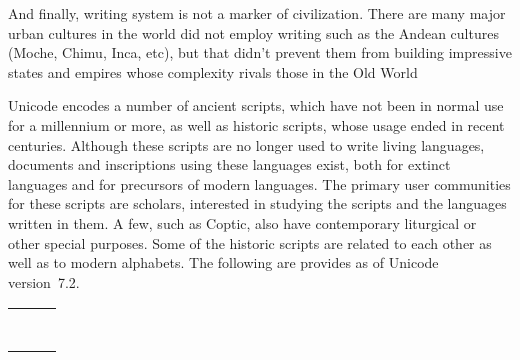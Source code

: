 And finally, writing system is not a marker of civilization. There are many major urban cultures in the world did not employ writing such as the Andean cultures (Moche, Chimu, Inca, etc), but that didn't prevent them from building impressive states and empires whose complexity rivals those in the Old World

Unicode encodes a number of ancient scripts, which have not been in normal use for a millennium or more, as well as historic scripts, whose usage ended in recent centuries. Although these scripts are no longer used to write living languages, documents and inscriptions using these languages exist, both for extinct languages and for precursors of modern languages. The primary user communities for these scripts are scholars, interested in studying the scripts and the languages written in them. A few, such as Coptic, also have contemporary liturgical or other special purposes. Some of the historic scripts are related to each other as well as to modern alphabets. The following are provides as of Unicode version~7.2.
\begin{center}
\begin{tabular}{lll}
\nameref{s:ogham}           
&\nameref{s:anatolian}
&\nameref{s:avestan}\\

\nameref{s:olditalic}      
&\nameref{s:oldsoutharabian}          
&\nameref{s:ugaritic} \\

    \nameref{s:runic}
&\nameref{s:phoenician} 
&\nameref{s:oldpersian} \\
    \nameref{s:gothic}            
    
&\nameref{s:imperialaramaic}            
&\nameref{s:sumero} \\

    \nameref{s:oldturkic}   
& \nameref{s:mandaic} 
& \nameref{ch:hieroglyphics}\\

   \nameref{s:linearb} 
&\nameref{s:parthian}       
&\nameref{s:meroitic}\\

    \nameref{s:cypriot}
&\nameref{s:inscriptionalpahlavi}       
& \nameref{s:lineara}\\
\end{tabular}
\end{center}

